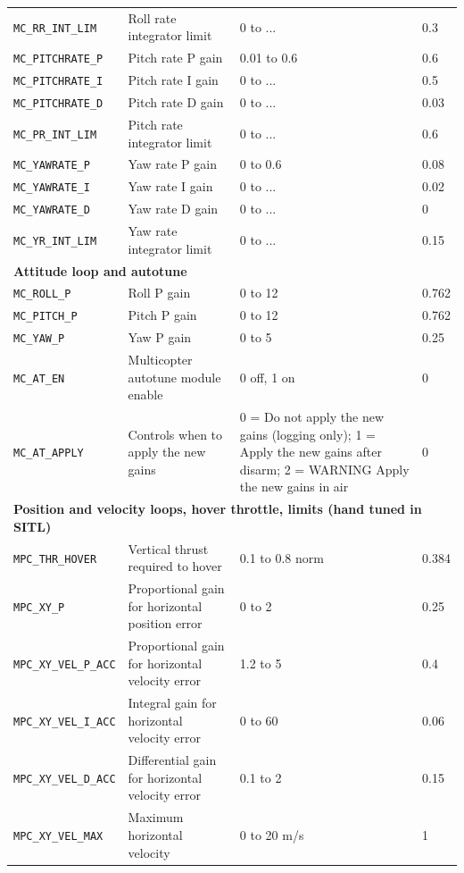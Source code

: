 \documentclass[11pt,a4paper]{article}
\newcommand{\param}[1]{\texttt{#1}}
\begin{document}
{\begin{longtable}{@{}p{3.3cm}p{5.6cm}p{3.6cm}p{1.9cm}@{}}
\param{MC\_RR\_INT\_LIM} & Roll rate integrator limit & 0 to ... & 0.3 \\
\param{MC\_PITCHRATE\_P} & Pitch rate P gain & 0.01 to 0.6 & 0.6 \\
\param{MC\_PITCHRATE\_I} & Pitch rate I gain & 0 to ... & 0.5 \\
\param{MC\_PITCHRATE\_D} & Pitch rate D gain & 0 to ... & 0.03 \\
\param{MC\_PR\_INT\_LIM} & Pitch rate integrator limit & 0 to ... & 0.6 \\
\param{MC\_YAWRATE\_P} & Yaw rate P gain & 0 to 0.6 & 0.08 \\
\param{MC\_YAWRATE\_I} & Yaw rate I gain & 0 to ... & 0.02 \\
\param{MC\_YAWRATE\_D} & Yaw rate D gain & 0 to ... & 0 \\
\param{MC\_YR\_INT\_LIM} & Yaw rate integrator limit & 0 to ... & 0.15 \\
\midrule
\multicolumn{4}{l}{\textbf{Attitude loop and autotune}} \\
\midrule
\param{MC\_ROLL\_P} & Roll P gain & 0 to 12 & 0.762 \\
\param{MC\_PITCH\_P} & Pitch P gain & 0 to 12 & 0.762 \\
\param{MC\_YAW\_P} & Yaw P gain & 0 to 5 & 0.25 \\
\param{MC\_AT\_EN} & Multicopter autotune module enable & 0 off, 1 on & 0 \\
\param{MC\_AT\_APPLY} & Controls when to apply the new gains & 0 = Do not apply the new gains (logging only); 1 = Apply the new gains after disarm; 2 = WARNING Apply the new gains in air & 0 \\
\midrule
\multicolumn{4}{l}{\textbf{Position and velocity loops, hover throttle, limits (hand tuned in SITL)}} \\
\midrule
\param{MPC\_THR\_HOVER} & Vertical thrust required to hover & 0.1 to 0.8 norm & 0.384 \\
\param{MPC\_XY\_P} & Proportional gain for horizontal position error & 0 to 2 & 0.25 \\
\param{MPC\_XY\_VEL\_P\_ACC} & Proportional gain for horizontal velocity error & 1.2 to 5 & 0.4 \\
\param{MPC\_XY\_VEL\_I\_ACC} & Integral gain for horizontal velocity error & 0 to 60 & 0.06 \\
\param{MPC\_XY\_VEL\_D\_ACC} & Differential gain for horizontal velocity error & 0.1 to 2 & 0.15 \\
\param{MPC\_XY\_VEL\_MAX} & Maximum horizontal velocity & 0 to 20 m/s & 1 \\

\end{longtable}}
\end{document}
